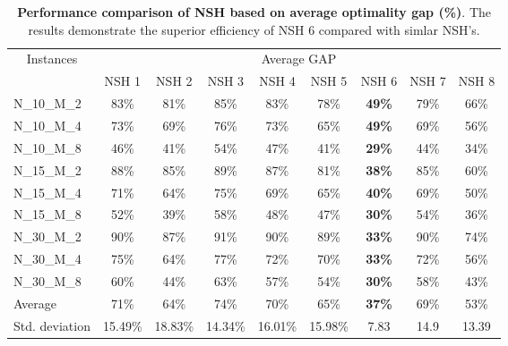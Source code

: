 \documentclass{article}
\begin{document}
\begin{table}
\centering %
 \caption{\textbf{Performance comparison of NSH based on average optimality gap (\%)}. The results demonstrate the superior efficiency of NSH 6 compared with simlar NSH's.} \label{tab:ResultadosNSH}
 \centering %
\begin{tabular}{|l|cccccccc|}
\hline
\multicolumn{1}{|c|}{\multirow{2}{*}{Instances}} & \multicolumn{8}{c|}{Average GAP}\\ %
\multicolumn{1}{|c|}{}& NSH 1 & NSH 2 & NSH 3 & NSH 4 & NSH 5 & NSH 6& NSH 7 & NSH 8 \\ \hline
N\_10\_M\_2& 83\%  & 81\%  & 85\%  & 83\%  & 78\%  & \textbf{49\%} & 79\%  & 66\%  \\
N\_10\_M\_4& 73\%  & 69\%  & 76\%  & 73\%  & 65\%  & \textbf{49\%} & 69\%  & 56\%  \\
N\_10\_M\_8& 46\%  & 41\%  & 54\%  & 47\%  & 41\%  & \textbf{29\%} & 44\%  & 34\%  \\
N\_15\_M\_2& 88\%  & 85\%  & 89\%  & 87\%  & 81\%  & \textbf{38\%} & 85\%  & 60\%  \\
N\_15\_M\_4& 71\%  & 64\%  & 75\%  & 69\%  & 65\%  & \textbf{40\%} & 69\%  & 50\%  \\
N\_15\_M\_8& 52\%  & 39\%  & 58\%  & 48\%  & 47\%  & \textbf{30\%} & 54\%  & 36\%  \\
N\_30\_M\_2& 90\%  & 87\%  & 91\%  & 90\%  & 89\%  & \textbf{33\%} & 90\%  & 74\%  \\
N\_30\_M\_4& 75\%  & 64\%  & 77\%  & 72\%  & 70\%  & \textbf{33\%} & 72\%  & 56\%  \\
N\_30\_M\_8& 60\%  & 44\%  & 63\%  & 57\%  & 54\%  & \textbf{30\%} & 58\%  & 43\%  \\ \hline
Average    & 71\%  & 64\%  & 74\%  & 70\%  & 65\%  & \textbf{37\%} & 69\%  & 53\%  \\
Std. deviation   & 15.49\%     & 18.83\%     & 14.34\%     & 16.01\%     & 15.98\%     & 7.83    & 14.9     & 13.39  \\ \hline
\end{tabular}
{}
\end{table}
\end{document}
